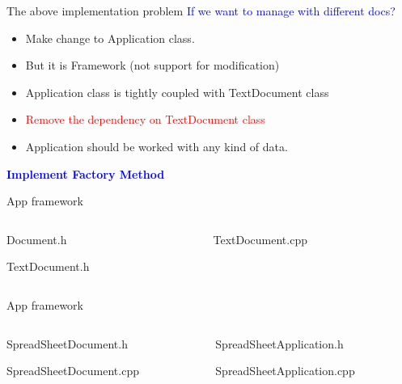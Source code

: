 \documentclass[13pt]{beamer}
\begin{document}
\begin{frame}{The above implementation problem}
	\textcolor{blue}{If we want to manage with different docs?}	
	\begin{itemize}
		\setlength\itemsep{1em}
		\item Make change to Application class.
		\item But it is Framework (not support for modification)
		\item Application class is tightly coupled with TextDocument class
		\item \textcolor{red}{Remove the dependency on TextDocument class}
		\item Application should be worked with any kind of data.
	\end{itemize}
	\begin{center}
	\textcolor{blue}{\textbf{Implement Factory Method}}
	\end{center}
\end{frame}

\begin{frame}{App framework}
\begin{columns}[T]
\begin{column}{.45\textwidth}
\lstset{basicstyle=\tiny,style=myCustomCppStyle}
Document.h

TextDocument.h

\end{column}

\begin{column}{.45\textwidth}
\lstset{basicstyle=\tiny,style=myCustomCppStyle}
TextDocument.cpp

\end{column}
\end{columns}
\end{frame}

\begin{frame}{App framework}
\begin{columns}[T]
\begin{column}{.45\textwidth}
\lstset{basicstyle=\tiny,style=myCustomCppStyle}
SpreadSheetDocument.h

SpreadSheetDocument.cpp

\end{column}

\begin{column}{.45\textwidth}
\lstset{basicstyle=\tiny,style=myCustomCppStyle}
SpreadSheetApplication.h

SpreadSheetApplication.cpp

\end{column}
\end{columns}
\end{frame}
\end{document}
